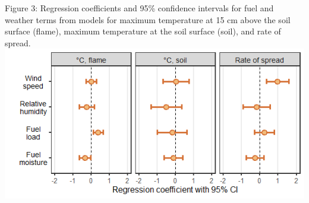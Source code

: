 \documentclass[
]{article}
\begin{document}
\newpage

Figure 3: Regression coefficients and 95\% confidence intervals for fuel
and weather terms from models for maximum temperature at 15 cm above the
soil surface (flame), maximum temperature at the soil surface (soil),
and rate of spread. \includegraphics{./springer/CI_gg-1.png}
\end{document}
